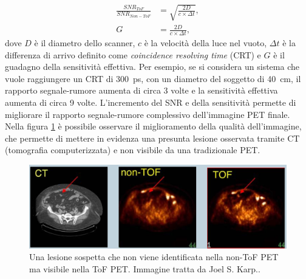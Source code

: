 \begin{equation}
	\begin{split}
		\frac{SNR_{ToF}}{SNR_{Non-ToF}}&=\sqrt{\frac{2D}{c \times \Delta t}}, \\
		G&=\frac{2D}{c\times\Delta t},
	\end{split}
\end{equation}
dove $D$ è il diametro dello scanner, $c$ è la velocità della luce nel vuoto, $\Delta t$ è la differenza di arrivo definito come \textit{coincidence resolving time} (CRT) e $G$ è il guadagno della sensitività  effettiva. Per esempio, se si considera un sistema che vuole raggiungere un CRT di \SI{300}{\pico\second}, con un diametro del soggetto di \SI{40}{\centi\meter}, il rapporto segnale-rumore aumenta di circa 3 volte e la sensitività effettiva aumenta di circa 9 volte. L'incremento del SNR e della sensitività permette di migliorare il rapporto segnale-rumore complessivo dell'immagine PET finale. Nella figura \ref{fig:tof_image} è possibile osservare il miglioramento della qualità dell'immagine, che permette di mettere in evidenza una presunta lesione osservata tramite CT (tomografia computerizzata) e non visibile da una tradizionale PET.
\begin{figure}[tbh]
	\centering
	\includegraphics[width=\linewidth]{./ImageFiles/tof_image.jpg}
	\caption{Una lesione sospetta che non viene identificata nella non-ToF PET ma visibile nella ToF PET. Immagine tratta da Joel S. Karp.\cite{Karp2006}.}
	\label{fig:tof_image}
\end{figure}
















